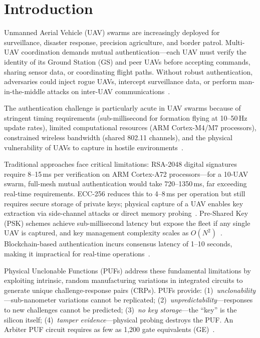 \documentclass[conference]{IEEEtran}
\begin{document}
\section{Introduction}
\label{sec:introduction}

Unmanned Aerial Vehicle (UAV) swarms are increasingly deployed for surveillance, disaster response, precision agriculture, and border patrol. Multi-UAV coordination demands mutual authentication---each UAV must verify the identity of its Ground Station (GS) and peer UAVs before accepting commands, sharing sensor data, or coordinating flight paths. Without robust authentication, adversaries could inject rogue UAVs, intercept surveillance data, or perform man-in-the-middle attacks on inter-UAV communications~\cite{securing_uav_fanet}.

The authentication challenge is particularly acute in UAV swarms because of stringent timing requirements (sub-millisecond for formation flying at 10--50\,Hz update rates), limited computational resources (ARM Cortex-M4/M7 processors), constrained wireless bandwidth (shared 802.11 channels), and the physical vulnerability of UAVs to capture in hostile environments~\cite{puf_uav_cross_domain}.

Traditional approaches face critical limitations: RSA-2048 digital signatures require 8--15\,ms per verification on ARM Cortex-A72 processors---for a 10-UAV swarm, full-mesh mutual authentication would take 720--1350\,ms, far exceeding real-time requirements. ECC-256 reduces this to 4--8\,ms per operation but still requires secure storage of private keys; physical capture of a UAV enables key extraction via side-channel attacks or direct memory probing~\cite{puf_lightweight_uav}. Pre-Shared Key (PSK) schemes achieve sub-millisecond latency but expose the fleet if any single UAV is captured, and key management complexity scales as $O(N^2)$~\cite{peer2peer_auth}. Blockchain-based authentication incurs consensus latency of 1--10 seconds, making it impractical for real-time operations~\cite{puf_iot_strong_adversary}.

Physical Unclonable Functions (PUFs) address these fundamental limitations by exploiting intrinsic, random manufacturing variations in integrated circuits to generate unique challenge-response pairs (CRPs). PUFs provide: (1)~\emph{unclonability}---sub-nanometer variations cannot be replicated; (2)~\emph{unpredictability}---responses to new challenges cannot be predicted; (3)~\emph{no key storage}---the ``key'' is the silicon itself; (4)~\emph{tamper evidence}---physical probing destroys the PUF. An Arbiter PUF circuit requires as few as 1,200 gate equivalents (GE)~\cite{puf_overview, arbiter_puf_iot}.
\end{document}
